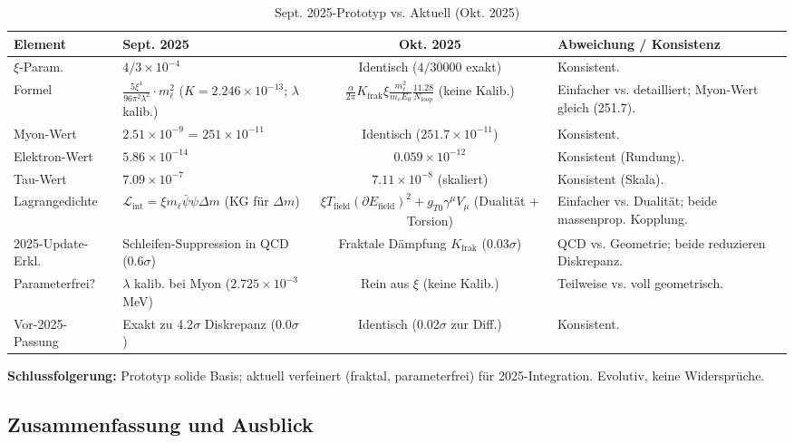 \documentclass[12pt,a4paper]{article}
\begin{document}
	\begin{table}[ht!]
		\centering
		\small
		\begin{adjustbox}{max width=\textwidth}
			\begin{tabular}{llcl}
				\toprule
				Element & Sept. 2025 & Okt. 2025 & Abweichung / Konsistenz \\
				\midrule
				$\xi$-Param. & $4/3 \times 10^{-4}$ & Identisch ($4/30000$ exakt) & Konsistent. \\
				Formel & $\frac{5\xi^4}{96\pi^2 \lambda^2} \cdot m_\ell^2$ ($K=2.246\times10^{-13}$; $\lambda$ kalib.) & $\frac{\alpha}{2\pi} K_\text{frak} \xi \frac{m_\ell^2}{m_e E_0} \frac{11.28}{N_\text{loop}}$ (keine Kalib.) & Einfacher vs. detailliert; Myon-Wert gleich (251.7). \\
				Myon-Wert & $2.51 \times 10^{-9}$ = $251 \times 10^{-11}$ & Identisch ($251.7 \times 10^{-11}$) & Konsistent. \\
				Elektron-Wert & $5.86 \times 10^{-14}$ & $0.059 \times 10^{-12}$ & Konsistent (Rundung). \\
				Tau-Wert & $7.09 \times 10^{-7}$ & $7.11 \times 10^{-8}$ (skaliert) & Konsistent (Skala). \\
				Lagrangedichte & $\mathcal{L}_\text{int} = \xi m_\ell \bar{\psi} \psi \Delta m$ (KG für $\Delta m$) & $\xi T_\text{field} (\partial E_\text{field})^2 + g_{T0} \gamma^\mu V_\mu$ (Dualität + Torsion) & Einfacher vs. Dualität; beide massenprop. Kopplung. \\
				2025-Update-Erkl. & Schleifen-Suppression in QCD (0.6$\sigma$) & Fraktale Dämpfung $K_\text{frak}$ (0.03$\sigma$) & QCD vs. Geometrie; beide reduzieren Diskrepanz. \\
				Parameterfrei? & $\lambda$ kalib. bei Myon ($2.725 \times 10^{-3}$ MeV) & Rein aus $\xi$ (keine Kalib.) & Teilweise vs. voll geometrisch. \\
				Vor-2025-Passung & Exakt zu 4.2$\sigma$ Diskrepanz (0.0$\sigma$) & Identisch (0.02$\sigma$ zur Diff.) & Konsistent. \\
				\bottomrule
			\end{tabular}
		\end{adjustbox}
		\caption{Sept. 2025-Prototyp vs. Aktuell (Okt. 2025)}
		\label{tab:prototype_comparison}
	\end{table}
	
	\textbf{Schlussfolgerung:} Prototyp solide Basis; aktuell verfeinert (fraktal, parameterfrei) für 2025-Integration. Evolutiv, keine Widersprüche.
	
	\subsection{Zusammenfassung und Ausblick}
	
\end{document}
